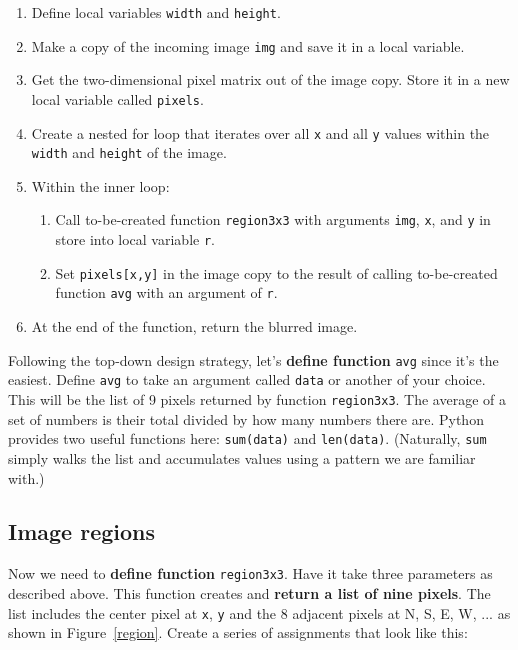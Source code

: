 \documentclass[titlepage]{tufte-book}
\newcounter{total}
\newcommand{\figref}[1]{Figure~\ref{#1}}
\begin{document}
\begin{enumerate}

\item Define local variables {\tt width} and {\tt height}.
\item Make a copy of the incoming image {\tt img} and save it in a local variable.
\item Get the two-dimensional pixel matrix out of the image copy. Store it in a new local variable called {\tt pixels}.
\item Create a nested for loop that iterates over all {\tt x} and all {\tt y} values within the {\tt width} and {\tt height} of the image.
\item Within the inner loop:
\begin{enumerate}
\item Call to-be-created function {\tt region3x3} with arguments {\tt img}, {\tt x}, and {\tt y} in store into local variable {\tt r}.
\item Set {\tt pixels[x,y]} in the image copy to the result of calling to-be-created function {\tt avg} with an argument of {\tt r}.
\end{enumerate}
\item At the end of the function, return the blurred image.
\end{enumerate} 

Following the top-down design strategy, let's {\bf define function} {\tt avg} since it's the easiest. Define {\tt avg} to take an argument called {\tt data} or another of your choice. This will be the list of 9 pixels returned by function {\tt region3x3}. The average of a set of numbers is their total divided by how many numbers there are. Python provides two useful functions here: {\tt sum(data)} and {\tt len(data)}.  (Naturally, {\tt sum} simply walks the list and accumulates values using a pattern we are familiar with.)

\subsection{Image regions}

Now we need to {\bf define function} {\tt region3x3}.  Have it take three parameters as described above. This function creates and {\bf return a list of nine pixels}. The list includes the center pixel at {\tt x}, {\tt y} and the 8 adjacent pixels at N, S, E, W, ... as shown in \figref{region}. Create a series of assignments that look like this:

\begin{marginfigure}
\begin{center}
\end{center}
\label{region}
\end{marginfigure}
\end{document}

